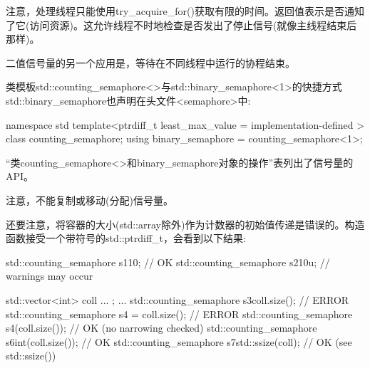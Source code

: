 注意，处理线程只能使用try\_acquire\_for()获取有限的时间。返回值表示是否通知了它(访问资源)。这允许线程不时地检查是否发出了停止信号(就像主线程结束后那样)。

二值信号量的另一个应用是，等待在不同线程中运行的协程结束。


类模板std::counting\_semaphore<>与std::binary\_semaphore<1>的快捷方式std::binary\_semaphore也声明在头文件<semaphore>中:

\begin{cpp}
namespace std {
	template<ptrdiff_t least_max_value = implementation-defined >
	class counting_semaphore;
	using binary_semaphore = counting_semaphore<1>;
}
\end{cpp}

“类counting\_semaphore<>和binary\_semaphore对象的操作”表列出了信号量的API。

注意，不能复制或移动(分配)信号量。

还要注意，将容器的大小(std::array除外)作为计数器的初始值传递是错误的。构造函数接受一个带符号的std::ptrdiff\_t，会看到以下结果:

\begin{cpp}
std::counting_semaphore s1{10}; // OK
std::counting_semaphore s2{10u}; // warnings may occur

std::vector<int> coll{ ... };
...
std::counting_semaphore s3{coll.size()}; // ERROR
std::counting_semaphore s4 = coll.size(); // ERROR
std::counting_semaphore s4(coll.size()); // OK (no narrowing checked)
std::counting_semaphore s6{int(coll.size())}; // OK
std::counting_semaphore s7{std::ssize(coll)}; // OK (see std::ssize())
\end{cpp}

